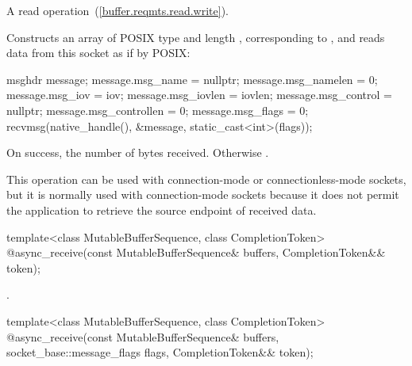 \begin{itemdescr}
\pnum
A read operation~(\ref{buffer.reqmts.read.write}).

\pnum
\effects Constructs an array  of POSIX type  and length , corresponding to , and reads data from this socket as if by POSIX:
\begin{codeblock}
msghdr message;
message.msg_name = nullptr;
message.msg_namelen = 0;
message.msg_iov = iov;
message.msg_iovlen = iovlen;
message.msg_control = nullptr;
message.msg_controllen = 0;
message.msg_flags = 0;
recvmsg(native_handle(), &message, static_cast<int>(flags));
\end{codeblock}


\pnum
\returns On success, the number of bytes received. Otherwise .

\pnum
 \begin{note} This operation can be used with connection-mode or connectionless-mode sockets, but it is normally used with connection-mode sockets because it does not permit the application to retrieve the source endpoint of received data. \end{note}
\end{itemdescr}

\begin{itemdecl}
template<class MutableBufferSequence, class CompletionToken>
  @\DEDUCED@ async_receive(const MutableBufferSequence& buffers,
                        CompletionToken&& token);
\end{itemdecl}

\begin{itemdescr}
\pnum
\returns {}.
\end{itemdescr}

\begin{itemdecl}
template<class MutableBufferSequence, class CompletionToken>
  @\DEDUCED@ async_receive(const MutableBufferSequence& buffers,
                        socket_base::message_flags flags,
                        CompletionToken&& token);
\end{itemdecl}


